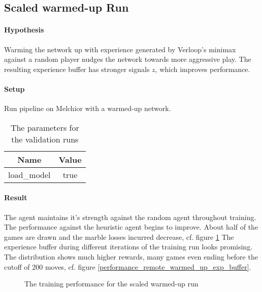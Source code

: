 \subsection{Scaled warmed-up Run}
\paragraph{Hypothesis} Warming the network up with experience generated by Verloop's minimax against a random player nudges the network towards more aggressive play. The resulting experience buffer has stronger signals $z$, which improves performance.

\paragraph{Setup} Run pipeline on Melchior with a warmed-up network.

\begin{table}[!h]
    \begin{center}
        \begin{tabular}{ c|c }
            Name        & Value \\
            \hline
            \hline
            load\_model & true  \\
        \end{tabular}
    \end{center}
    \caption{The parameters for the validation runs}
\end{table}

\paragraph{Result} The agent maintains it's strength against the random agent throughout training. The performance against the heuristic agent begins to improve. About half of the games are drawn and the marble losses incurred decrease, cf. figure \ref{performance_remote_warmed_up} The experience buffer during different iterations of the training run looks promising. The distribution shows much higher rewards, many games even ending before the cutoff of 200 moves, cf. figure \ref{performance_remote_warmed_up_exp_buffer}.

\begin{figure}[!h]
    \centering
    \hfill
    \caption{The training performance for the scaled warmed-up run}
    \label{performance_remote_warmed_up}
\end{figure}

